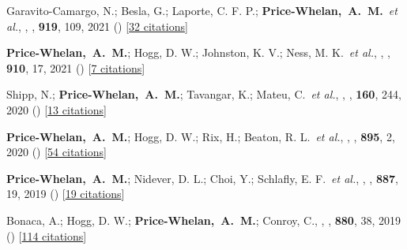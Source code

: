 \item[{\color{deemph}\scriptsize15}]Garavito-Camargo, N.; Besla, G.; Laporte, C. F. P.; \textbf{Price-Whelan,~A.~M.}~\textit{et al.}, , \apj, \textbf{919}, 109, 2021 () [\href{http://adsabs.harvard.edu/abs/2021ApJ...919..109G}{32 citations}]

\item[{\color{deemph}\scriptsize14}]\textbf{Price-Whelan,~A.~M.}; Hogg, D. W.; Johnston, K. V.; Ness, M. K.~\textit{et al.}, , \apj, \textbf{910}, 17, 2021 () [\href{http://adsabs.harvard.edu/abs/2021ApJ...910...17P}{7 citations}]

\item[{\color{deemph}\scriptsize13}]Shipp, N.; \textbf{Price-Whelan,~A.~M.}; Tavangar, K.; Mateu, C.~\textit{et al.}, , \aj, \textbf{160}, 244, 2020 () [\href{http://adsabs.harvard.edu/abs/2020AJ....160..244S}{13 citations}]

\item[{\color{deemph}\scriptsize12}]\textbf{Price-Whelan,~A.~M.}; Hogg, D. W.; Rix, H.; Beaton, R. L.~\textit{et al.}, , \apj, \textbf{895}, 2, 2020 () [\href{http://adsabs.harvard.edu/abs/2020ApJ...895....2P}{54 citations}]

\item[{\color{deemph}\scriptsize11}]\textbf{Price-Whelan,~A.~M.}; Nidever, D. L.; Choi, Y.; Schlafly, E. F.~\textit{et al.}, , \apj, \textbf{887}, 19, 2019 () [\href{http://adsabs.harvard.edu/abs/2019ApJ...887...19P}{19 citations}]

\item[{\color{deemph}\scriptsize10}]Bonaca, A.; Hogg, D. W.; \textbf{Price-Whelan,~A.~M.}; Conroy, C., , \apj, \textbf{880}, 38, 2019 () [\href{http://adsabs.harvard.edu/abs/2019ApJ...880...38B}{114 citations}]

